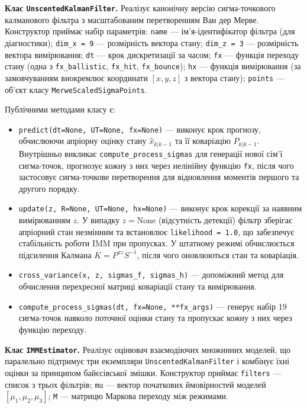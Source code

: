 \textbf{Клас \texttt{UnscentedKalmanFilter}.} Реалізує канонічну версію
сигма-точкового калманового фільтра з масштабованим перетворенням Ван дер Мерве.
Конструктор приймає набір параметрів: \texttt{name} --- ім'я-ідентифікатор фільтра
(для діагностики); \texttt{dim\_x = 9} --- розмірність вектора стану;
\texttt{dim\_z = 3} --- розмірність вектора вимірювання; \texttt{dt} --- крок
дискретизації за часом; \texttt{fx} --- функція переходу стану (одна з
\texttt{fx\_ballistic}, \texttt{fx\_hit}, \texttt{fx\_bounce}); \texttt{hx} ---
функція вимірювання (за замовчуванням виокремлює координати $[x, y, z]$ з вектора
стану); \texttt{points} --- об'єкт класу \texttt{MerweScaledSigmaPoints}.

Публічними методами класу є:
\begin{itemize}
    \item \texttt{predict(dt=None, UT=None, fx=None)} --- виконує крок прогнозу,
    обчислюючи апріорну оцінку стану $\hat{x}_{k|k-1}$ та її коваріацію
    $P_{k|k-1}$. Внутрішньо викликає \texttt{compute\_process\_sigmas} для генерації
    нової сім'ї сигма-точок, прогнозує кожну з них через нелінійну функцію
    \texttt{fx}, після чого застосовує сигма-точкове перетворення для відновлення
    моментів першого та другого порядку.
    \item \texttt{update(z, R=None, UT=None, hx=None)} --- виконує крок корекції за
    наявним вимірюванням $z$. У випадку $z = \text{None}$ (відсутність детекції)
    фільтр зберігає апріорний стан незмінним та встановлює \texttt{likelihood = 1.0},
    що забезпечує стабільність роботи \gls{IMM} при пропусках. У штатному режимі
    обчислюється підсилення Калмана $K = P^{xz} S^{-1}$, після чого оновлюються
    стан та коваріація.
    \item \texttt{cross\_variance(x, z, sigmas\_f, sigmas\_h)} --- допоміжний
    метод для обчислення перехресної матриці коваріації стану та вимірювання.
    \item \texttt{compute\_process\_sigmas(dt, fx=None, **fx\_args)} --- генерує
    набір 19 сигма-точок навколо поточної оцінки стану та пропускає кожну з них
    через функцію переходу.
\end{itemize}

\textbf{Клас \texttt{IMMEstimator}.} Реалізує оцінювач взаємодіючих множинних
моделей, що паралельно підтримує три екземпляри \texttt{UnscentedKalmanFilter} і
комбінує їхні оцінки за принципом байєсівської змішки. Конструктор приймає
\texttt{filters} --- список з трьох фільтрів; \texttt{mu} --- вектор початкових
ймовірностей моделей $[\mu_1, \mu_2, \mu_3]$; \texttt{M} --- матрицю Маркова
переходу між режимами.

